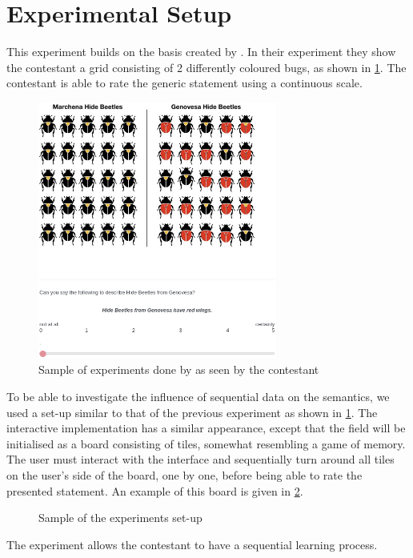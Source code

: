 \documentclass[twoside]{uva-inf-bachelor-thesis}
\theoremstyle{definition}
\begin{document}
\section{Experimental Setup}
This experiment builds on the basis created by \cite{RooijSchulzGenAlt}. In their experiment they show the contestant a grid consisting of 2 differently coloured bugs, as shown in \ref{fig:beetle_example}. The contestant is able to rate the generic statement using a continuous scale.
\begin{figure}[h]
    \centering
    \includegraphics[width=0.7\textwidth]{Project/Thesis/LaTeX/images/beetles_example.png}
    \caption{Sample of experiments done by \cite{RooijSchulzGenAlt} as seen by the contestant}
    \label{fig:beetle_example}
\end{figure}
To be able to investigate the influence of sequential data on the semantics, we used a set-up similar to that of the previous experiment as shown in \ref{fig:beetle_example}. The interactive implementation has a similar appearance, except that the field will be initialised as a board consisting of tiles, somewhat resembling a game of memory. The user must interact with the interface and sequentially turn around all tiles on the user's side of the board, one by one, before being able to rate the presented statement. An example of this board is given in \ref{fig:beetle_example_mem}. 
\begin{figure}[h]
    \centering
    \caption{Sample of the experiments set-up}
    \label{fig:beetle_example_mem}
\end{figure}
The experiment allows the contestant to have a sequential learning process.
\end{document}
